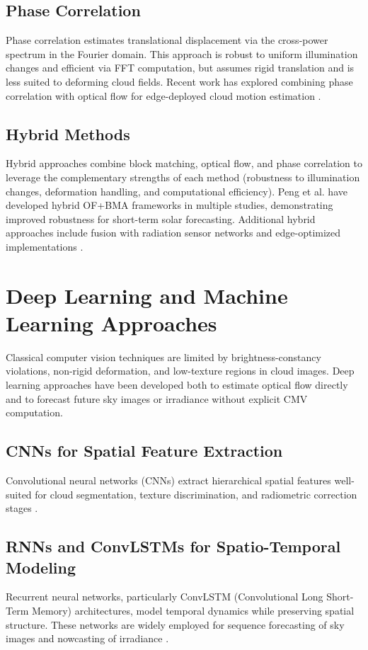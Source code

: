\subsection{Phase Correlation}
Phase correlation estimates translational displacement via the cross-power spectrum in the Fourier domain. This approach is robust to uniform illumination changes and efficient via FFT computation, but assumes rigid translation and is less suited to deforming cloud fields. Recent work has explored combining phase correlation with optical flow for edge-deployed cloud motion estimation \cite{raut2023}.

\subsection{Hybrid Methods}
Hybrid approaches combine block matching, optical flow, and phase correlation to leverage the complementary strengths of each method (robustness to illumination changes, deformation handling, and computational efficiency). Peng et al. \cite{peng2016,peng2023hybrid} have developed hybrid OF+BMA frameworks in multiple studies, demonstrating improved robustness for short-term solar forecasting. Additional hybrid approaches include fusion with radiation sensor networks \cite{rodriguezbenitez2021} and edge-optimized implementations \cite{raut2023}.

\section{Deep Learning and Machine Learning Approaches}
\label{sec:deep_learning}

Classical computer vision techniques are limited by brightness-constancy violations, non-rigid deformation, and low-texture regions in cloud images. Deep learning approaches have been developed both to estimate optical flow directly and to forecast future sky images or irradiance without explicit CMV computation.

\subsection{CNNs for Spatial Feature Extraction}
Convolutional neural networks (CNNs) extract hierarchical spatial features well-suited for cloud segmentation, texture discrimination, and radiometric correction stages \cite{nouri2021skycam,doshi2022,jung2020}.

\subsection{RNNs and ConvLSTMs for Spatio-Temporal Modeling}
Recurrent neural networks, particularly ConvLSTM (Convolutional Long Short-Term Memory) architectures, model temporal dynamics while preserving spatial structure. These networks are widely employed for sequence forecasting of sky images and nowcasting of irradiance \cite{shi2015,qin2022cloudcast}.

